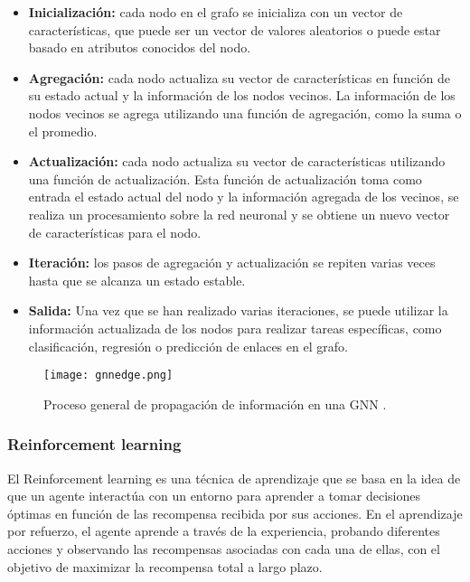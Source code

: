 \begin{itemize}
      \item \textbf{Inicialización:} cada nodo en el grafo se inicializa con un vector de características,
            que puede ser un vector de valores aleatorios o puede estar basado en atributos conocidos del nodo.
      \item \textbf{Agregación:} cada nodo actualiza su vector de características en función de su estado
            actual y la información de los nodos vecinos. La información de los nodos vecinos se agrega utilizando
            una función de agregación, como la suma o el promedio.
      \item \textbf{Actualización:} cada nodo actualiza su vector de características utilizando una función
            de actualización. Esta función de actualización toma como entrada el estado actual del nodo y la
            información agregada de los vecinos, se realiza un procesamiento sobre la red neuronal y se obtiene
            un nuevo vector de características para el nodo.
      \item \textbf{Iteración:} los pasos de agregación y actualización se repiten varias veces hasta que
            se alcanza un estado estable.
      \item \textbf{Salida:} Una vez que se han realizado varias iteraciones, se puede utilizar la información
            actualizada de los nodos para realizar tareas específicas, como clasificación, regresión o predicción de
            enlaces en el grafo.
\end{itemize}

\begin{figure}[ht]
      \label{fig:gnn-propagation}
      \centering
      \texttt{[image: gnnedge.png]}
      \caption{Proceso general de propagación de información en una GNN \cite{DeepFindr_2021}.}\label{fig:gnn-edge}
\end{figure}

\subsubsection{Reinforcement learning}
El Reinforcement learning \cite{Bhatt_2018}\cite{Huggingface_DeepRL} es una
técnica de aprendizaje que se basa en la idea de que un agente interactúa con
un entorno para aprender a tomar decisiones óptimas en función de las
recompensa recibida por sus acciones. En el aprendizaje por refuerzo, el agente
aprende a través de la experiencia, probando diferentes acciones y observando
las recompensas asociadas con cada una de ellas, con el objetivo de maximizar
la recompensa total a largo plazo.\medskip

